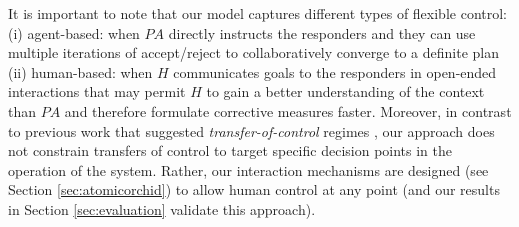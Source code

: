 It is important to note that our model captures different types of flexible control: (i) agent-based: when $PA$ directly instructs the responders  and they can use multiple iterations of accept/reject to collaboratively converge to a definite  plan (ii) human-based: when $H$ communicates goals to the responders in open-ended interactions that may permit $H$ to gain a better understanding of the context than $PA$ and therefore formulate corrective measures faster. Moreover, in contrast to previous work that suggested \emph{transfer-of-control} regimes \cite{scerri:etal:2005}, our approach does not constrain transfers of control to target specific decision points in the operation of the system. Rather, our interaction mechanisms are designed (see Section \ref{sec:atomicorchid}) to allow human control at any point (and our results  in Section \ref{sec:evaluation} validate this approach). 



